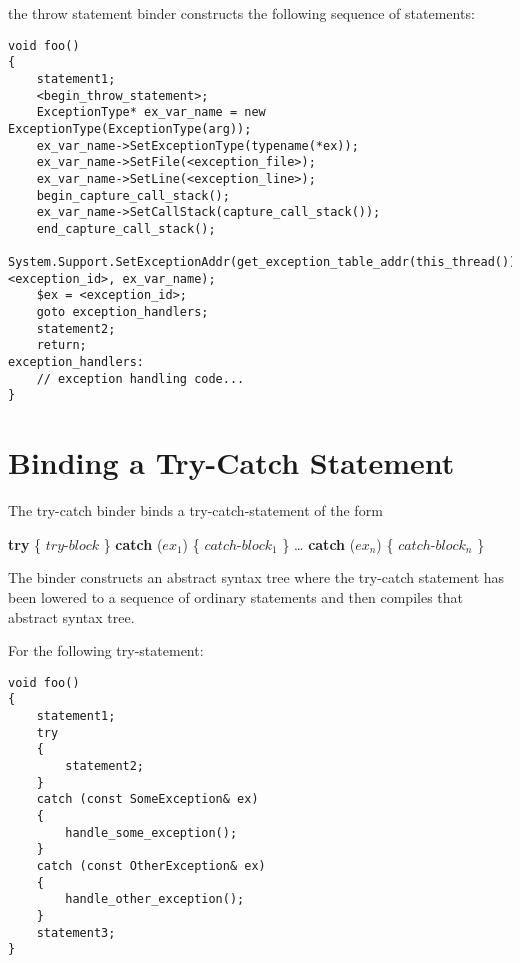 \documentclass[a4paper,oneside,11pt]{book}
\theoremstyle{definition}
\begin{document}
\begin{flushleft}
the throw statement binder constructs the following sequence of statements:

\lstset{language=Cmajor}
\begin{lstlisting}[frame=trBL]
void foo()
{
    statement1;
    <begin_throw_statement>;
    ExceptionType* ex_var_name = new ExceptionType(ExceptionType(arg));
    ex_var_name->SetExceptionType(typename(*ex));
    ex_var_name->SetFile(<exception_file>);
    ex_var_name->SetLine(<exception_line>);
    begin_capture_call_stack();
    ex_var_name->SetCallStack(capture_call_stack());
    end_capture_call_stack();
    System.Support.SetExceptionAddr(get_exception_table_addr(this_thread()), <exception_id>, ex_var_name);
    $ex = <exception_id>;
    goto exception_handlers;
    statement2;
    return;
exception_handlers:
    // exception handling code...
}
\end{lstlisting}
\end{flushleft}

\section{Binding a Try-Catch Statement}

The try-catch binder binds a try-catch-statement of the form\\
\begin{flushleft}
\textbf{try} \{ $try\textrm{-}block$ \} \textbf{catch} ($ex_1$) \{ $catch\textrm{-}block_1$ \} \ldots{} \textbf{catch} ($ex_n$) \{ $catch\textrm{-}block_n$ \}
\end{flushleft}
\begin{flushleft}
The binder constructs an abstract syntax tree where the try-catch statement has been lowered to a sequence of ordinary statements and
then compiles that abstract syntax tree.
\end{flushleft}

For the following try-statement:

\lstset{language=Cmajor}
\begin{lstlisting}[frame=trBL]
void foo()
{
    statement1;
    try
    {
        statement2;
    }
    catch (const SomeException& ex)
    {
        handle_some_exception();
    }
    catch (const OtherException& ex)
    {
        handle_other_exception();
    }
    statement3;
}
\end{lstlisting}
\end{document}
